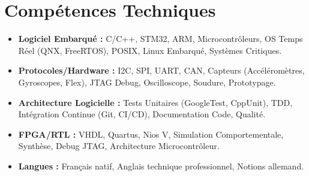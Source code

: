 \documentclass[a4paper,11pt]{article}
\begin{document}
\section{Comp\'etences Techniques}
\begin{itemize}[leftmargin=*, nosep]
    \item \small{\textbf{Logiciel Embarqu\'e :} C/C++, STM32, ARM, Microcontr\^oleurs, OS Temps R\'eel (QNX, FreeRTOS), POSIX, Linux Embarqu\'e, Syst\`emes Critiques.}
    \item \small{\textbf{Protocoles/Hardware :} I2C, SPI, UART, CAN, Capteurs (Acc\'el\'erom\`etres, Gyroscopes, Flex), JTAG Debug, Oscilloscope, Soudure, Prototypage.}
    \item \small{\textbf{Architecture Logicielle :} Tests Unitaires (GoogleTest, CppUnit), TDD, Intégration Continue (Git, CI/CD), Documentation Code, Qualité.}
    \item \small{\textbf{FPGA/RTL :} VHDL, Quartus, Nios V, Simulation Comportementale, Synth\`ese, Debug JTAG, Architecture Microcontr\^oleur.}
    \item \small{\textbf{Langues :} Fran\c{c}ais natif, Anglais technique professionnel, Notions allemand.}
\end{itemize}
\end{document}
